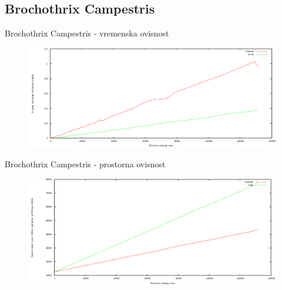 \documentclass[utf8]{beamer}
\begin{document}
\subsection{Brochothrix Campestris}
\begin{frame}{Brochothrix Campestris - vremenska ovisnost}
\begin{figure}[h!]	
	\centering
	\includegraphics[width=1\textwidth]{media/time_2.png}
\end{figure}

\end{frame}
\begin{frame}{Brochothrix Campestris - prostorna ovisnost}

\begin{figure}[h!]	
	\centering
	\includegraphics[width=1\textwidth]{media/memory_2.png}
\end{figure}

\end{frame}
\end{document}
